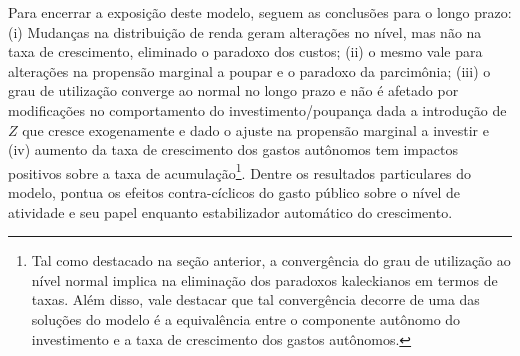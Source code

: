 Para encerrar a exposição deste modelo, seguem as conclusões para o longo prazo: (i) Mudanças na distribuição de renda geram alterações no nível, mas não na taxa de crescimento, eliminado o paradoxo dos custos; (ii) o mesmo vale para alterações na propensão marginal a poupar e o paradoxo da parcimônia; (iii) o grau de utilização converge ao normal no longo prazo e não é afetado por modificações no comportamento do investimento/poupança dada a introdução de $Z$ que cresce exogenamente e dado o ajuste na propensão marginal a investir e (iv) aumento da taxa de crescimento dos gastos autônomos tem impactos positivos sobre a taxa de acumulação\footnote{Tal como destacado na seção anterior, a convergência do grau de utilização ao nível normal implica na eliminação dos paradoxos kaleckianos em termos de taxas. Além disso, vale destacar que tal convergência decorre de uma das soluções do modelo é a equivalência entre o componente autônomo do investimento e a taxa de crescimento dos gastos autônomos.}.  Dentre os resultados particulares do modelo, \textcite{allain_macroeconomic_2014} pontua os efeitos contra-cíclicos do gasto público sobre o nível de atividade e seu papel enquanto estabilizador automático do crescimento.



